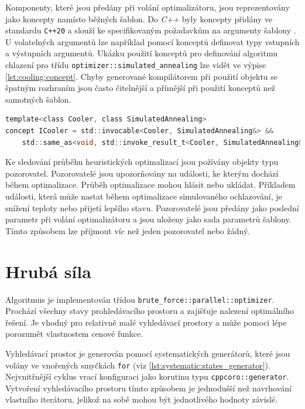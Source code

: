 Komponenty, které jsou předány při volání optimalizátoru, jsou reprezentovány jako koncepty namísto běžných šablon.
Do \textit{C++} byly koncepty přidány ve standardu \texttt{C++20} a slouží ke specifikovaným požadavkům na argumenty šablony \cite{concepts}.
U volatelných argumentů lze například pomocí konceptů definovat typy vstupních a výstupních argumentů.
Ukázku použití konceptů pro definování algoritmu chlazení pro třídu \texttt{optimizer::simulated\_annealing} lze vidět ve výpise \ref{lst:cooling:concept}.
Chyby generované kompilátorem při použití objektu se špatným rozhraním jsou často čitelnější a přímější při použití konceptů než samotných šablon.

\begin{lstlisting}[caption={~Koncept pro kontrolu chladícího algoritmu},label={lst:cooling:concept},captionpos=t,abovecaptionskip=-\medskipamount,belowcaptionskip=\medskipamount,language=C]
template<class Cooler, class SimulatedAnnealing>
concept ICooler = std::invocable<Cooler, SimulatedAnnealing&> &&
    std::same_as<void, std::invoke_result_t<Cooler, SimulatedAnnealing&>>;
\end{lstlisting}


Ke sledování průběhu heuristických optimalizací jsou požívány objekty typu pozorovatel.
Pozorovatelé jsou upozorňovány na události, ke kterým dochází během optimalizace.
Průběh optimalizace mohou hlásit nebo ukládat.
Příkladem události, která může nastat během optimalizace simulovaného ochlazování, je snížení teploty nebo přijetí lepšího stavu.
Pozorovatelé jsou předány jako poslední parametr při volání optimalizátoru a jsou uloženy jako sada parametrů šablony.
Tímto způsobem lze přijmout víc než jeden pozorovatel nebo žádný.


\section{Hrubá síla}
Algoritmus je implementován třídou \texttt{brute\_force::parallel::optimizer}.
Prochází všechny stavy prohledávacího prostoru a zajišťuje nalezení optimálního řešení.
Je vhodný pro relativně malé vyhledávací prostory a může pomoci lépe porozumět vlastnostem cenové funkce.

Vyhledávací prostor je generován pomocí systematických generátorů, které jsou volány ve vnořených smyčkách \texttt{for} (viz \ref{lst:systematic:states_generator}).
Nejvnitřnější cyklus vrací konfiguraci jako korutinu typu \texttt{cppcoro::generator}.
Vytvoření vyhledávacího prostoru tímto způsobem je jednodušší než navrhování vlastního iterátoru, jelikož na sobě mohou být jednotlivého hodnoty závislé.

